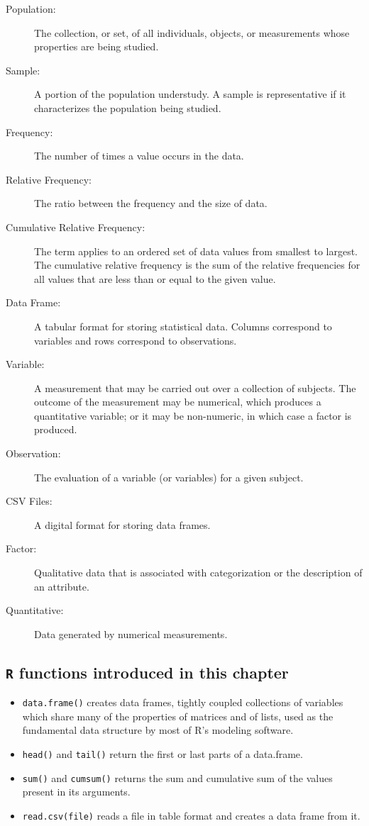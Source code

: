 \documentclass[
]{krantz}
\theoremstyle{definition}
\theoremstyle{definition}
\theoremstyle{definition}
\theoremstyle{remark}
\begin{document}
\begin{description}
\item[Population:]
The collection, or set, of all individuals, objects, or measurements whose properties are being studied.
\item[Sample:]
A portion of the population understudy. A sample is representative if it characterizes the population being studied.
\item[Frequency:]
The number of times a value occurs in the data.
\item[Relative Frequency:]
The ratio between the frequency and the size of data.
\item[Cumulative Relative Frequency:]
The term applies to an ordered set of data values from smallest to largest. The cumulative relative frequency is the sum of the relative frequencies for all values that are less than or equal to the given value.
\item[Data Frame:]
A tabular format for storing statistical data. Columns correspond to variables and rows correspond to observations.
\item[Variable:]
A measurement that may be carried out over a collection of subjects. The outcome of the measurement may be numerical, which produces a quantitative variable; or it may be non-numeric, in which case a factor is produced.
\item[Observation:]
The evaluation of a variable (or variables) for a given subject.
\item[CSV Files:]
A digital format for storing data frames.
\item[Factor:]
Qualitative data that is associated with categorization or the description of an attribute.
\item[Quantitative:]
Data generated by numerical measurements.
\end{description}

\hypertarget{r-funcs}{%
\subsection*{\texorpdfstring{\texttt{R} functions introduced in this chapter}{R functions introduced in this chapter}}\label{r-funcs}}


\begin{itemize}
\item
  \texttt{data.frame()} creates data frames, tightly coupled collections of variables which share many of the properties of matrices and of lists, used as the fundamental data structure by most of R's modeling software.
\item
  \texttt{head()} and \texttt{tail()} return the first or last parts of a data.frame.
\item
  \texttt{sum()} and \texttt{cumsum()} returns the sum and cumulative sum of the values present in its arguments.
\item
  \texttt{read.csv(file)} reads a file in table format and creates a data frame from it.
\end{itemize}
\end{document}
